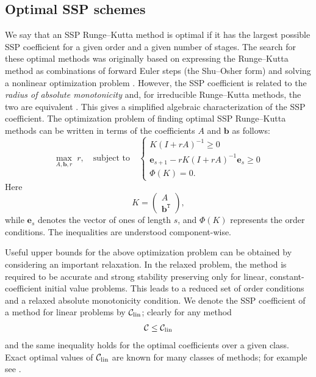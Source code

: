 \subsection{Optimal SSP schemes}\label{subsec:Optimal_SSPRK}
We say that an SSP Runge--Kutta method is optimal if it has the largest 
possible SSP coefficient for a given order and a given number of stages.
The search for these optimal methods was originally based on
expressing the Runge--Kutta method as combinations of forward Euler
steps (the Shu--Osher form) and solving a nonlinear optimization
problem \cite{Gottlieb/Shu:1998, Gottlieb2001, Spiteri2003a, Spiteri2003b, 
Ruuth2004, Ruuth:2006}.
However, the SSP coefficient is related to the 
\emph{radius of absolute monotonicity} \cite{Kraaijevanger1991} and, 
for irreducible Runge--Kutta methods, the two are equivalent 
\cite{Ferracina2004, Higueras2004}.
This gives a simplified algebraic characterization of the SSP coefficient.
\cite{Ferracina2005}
The optimization problem of finding optimal SSP Runge--Kutta methods
can be written in terms of the coefficients $A$ and $\bm{b}$ as
follows:
\begin{equation}\label{eq:SSP_opt}
    \max_{A, \bm{b}, r} \; r, \quad \text{subject to} \quad \left\{
                                                 \begin{array}{ll}
                                                   K(I + rA)^{-1} \geq 0 \\
                                                   \bm{e}_{s+1} - rK(I + rA)^{-1}\bm{e}_{s} \geq 0 \\
                                                   \Phi(K) = 0.
                                                 \end{array}
                                               \right.
\end{equation}
Here
\begin{equation*}
    K = \left(
            \begin{array}{c}
                     A              \\
                     \bm{b}^{\texttt{T}}
            \end{array}
         \right),
\end{equation*}
while $\bm{e}_s$ denotes the vector of ones of length $s$,
and \( \Phi(K) \) represents the  order conditions.
The inequalities are understood component-wise.

Useful upper bounds for the above optimization problem can be obtained 
by considering an important relaxation. 
In the relaxed problem, the method is required to be accurate and strong 
stability preserving only for linear, constant-coefficient initial value problems. 
This leads to a reduced set of order conditions and a relaxed absolute 
monotonicity condition.
We denote the SSP coefficient of a method for linear problems by $\mathcal{C}_{\text{lin}}$; 
clearly for any method
\begin{align*}
	\mathcal{C}\le\mathcal{C}_{\text{lin}}
\end{align*}
and the same inequality holds for the optimal coefficients over a given class.
Exact optimal values of $\mathcal{C}_{\text{lin}}$ are known for many classes of methods; for
example see \cite{Kraaijevanger1986,ketcheson2009a}.

